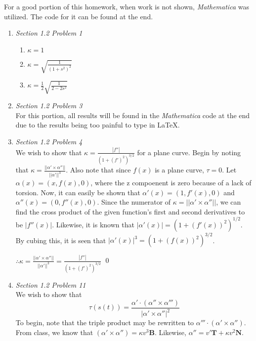 \documentclass{article}
\begin{document}
For a good portion of this homework, when work is not shown, \textit{Mathematica} was utilized.
The code for it can be found at the end.

\begin{enumerate}

\item \textit{Section 1.2 Problem 1}\\

\begin{enumerate}

\item $\kappa = 1$

\item $\kappa = \sqrt{\frac{1}{(1+s^2)^2}}$

\item $\kappa = \frac{1}{2}\sqrt{\frac{1}{2-2s^2}}$

\end{enumerate}

\item \textit{Section 1.2 Problem 3}\\
\newline
For this portion, all results will be found in the \textit{Mathematica} code at the end due to the results being too painful to type in \LaTeX.

\item \textit{Section 1.2 Problem 4}\\
\newline
We wish to show that $\kappa = \frac{|f''|}{(1+(f')^2)^{3/2}}$ for a plane curve.
Begin by noting that $\kappa = \frac{||\alpha' \times \alpha''||}{||\alpha'||^3}$. 
Also note that since $f(x)$ is a plane curve, $\tau = 0$.
Let $\alpha(x) = (x, f(x), 0)$, where the z compoenent is zero because of a lack of torsion.
Now, it can easily be shown that $\alpha'(x) = (1, f'(x), 0)$ and $\alpha''(x) = (0, f''(x), 0)$.
Since the numerator of $\kappa = ||\alpha' \times \alpha''||$, we can find the cross product of the given function's first and second derivatives to be $|f''(x)|$.
Likewise, it is known that $|\alpha'(x)| = (1 + (f'(x))^2)^{1/2}$.
By cubing this, it is seen that $|\alpha'(x)|^3 = (1 + (f(x))^2)^{3/2}$. 

$\therefore \kappa = \frac{||\alpha' \times \alpha''||}{||\alpha'||^3} = \frac{|f''|}{(1+(f')^2)^{3/2}}$
\qed

\item \textit{Section 1.2 Problem 11}\\
\newline
We wish to show that 
\begin{equation*}
\tau(s(t)) = \frac{\alpha' \cdot (\alpha'' \times \alpha''')}{|\alpha' \times \alpha''|^2}
\end{equation*}
To begin, note that the triple product may be rewritten to $\alpha''' \cdot (\alpha' \times \alpha'')$. 
From class, we know that $(\alpha' \times \alpha'') = \kappa v^3 \mathbf{B}$.
Likewise, $\alpha'' = v'\mathbf{T} + \kappa v^2 \mathbf{N}$.


\end{enumerate}
\end{document}
